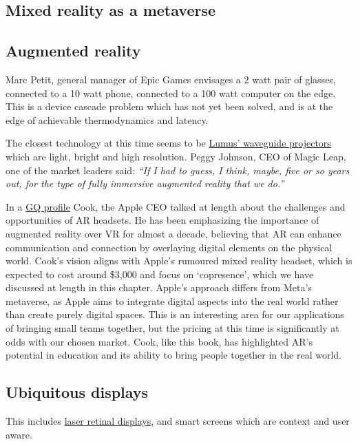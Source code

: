 \subsection{Mixed reality as a metaverse}

\subsection{Augmented reality}
Marc Petit, general manager of Epic Games envisages a 2 watt pair of glasses, connected to a 10 watt phone, connected to a 100 watt computer on the edge. This is a device cascade problem which has not yet been solved, and is at the edge of achievable thermodynamics and latency.\par
The closest technology at this time seems to be \href{https://lumusvision.com/}{Lumus' waveguide projectors} which are light, bright and high resolution. 
Peggy Johnson, CEO of Magic Leap, one of the market leaders said: \textit{``If I had to guess, I think, maybe, five or so years out, for the type of fully immersive augmented reality that we do.''}\par 
In a \href{https://www.gq.com/story/tim-cook-global-creativity-awards-cover-2023?mbid=social_twitter}{GQ profile} Cook, the Apple CEO talked at length about the challenges and opportunities of AR headsets. He has been emphasizing the importance of augmented reality over VR for almost a decade, believing that AR can enhance communication and connection by overlaying digital elements on the physical world. Cook's vision aligns with Apple's rumoured mixed reality headset, which is expected to cost around \$3,000 and focus on `copresence', which we have discussed at length in this chapter. Apple's approach differs from Meta's metaverse, as Apple aims to integrate digital aspects into the real world rather than create purely digital spaces. This is an interesting area for our applications of bringing small teams together, but the pricing at this time is significantly at odds with our chosen market. Cook, like this book, has highlighted AR's potential in education and its ability to bring people together in the real world. 
\subsection{Ubiquitous displays}
This includes \href{https://skarredghost.com/2022/06/28/mojo-vision-contact-tested-eye/}{laser retinal displays}, and smart screens which are context and user aware.
